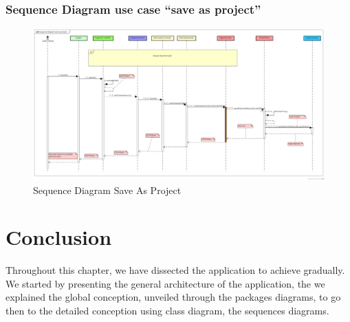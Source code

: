 	\clearpage
	\newpage
		\subsubsection{Sequence Diagram use case ``save as project''}
	\begin{figure}[h]
		\centering
		\includegraphics[width=1\textwidth]{SequenceDiagramSaveAsProject.png}
		\caption{Sequence Diagram Save As Project}
	\end{figure}
	\clearpage
	\newpage
	\section{Conclusion}
	Throughout this chapter, we have dissected the application to achieve gradually.
	We started by presenting the general architecture of the application, the we explained the global conception, unveiled through the packages diagrams, to go then to the detailed conception using class diagram, the sequences diagrams.  
	
